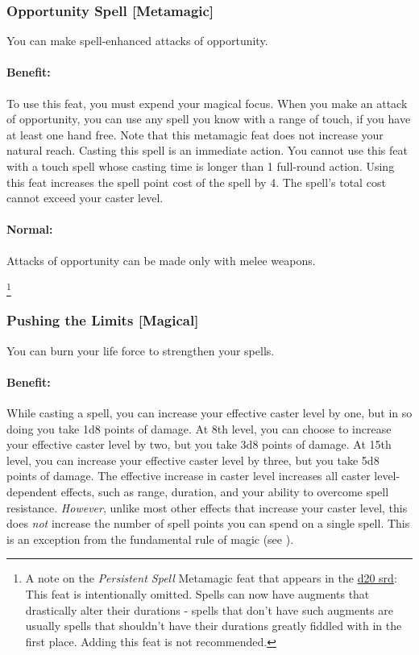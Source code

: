 \subsubsection[Opportunity Spell]{Opportunity Spell [Metamagic]}
\label{Feat:OpportunitySpell}
You can make spell-enhanced attacks of opportunity.

\paragraph{Benefit:} To use this feat, you must expend your magical focus. 
When you make an attack of opportunity, you can use any spell you know with a range of touch, if you have at least one hand free.
Note that this metamagic feat does not increase your natural reach.
Casting this spell is an immediate action.
You cannot use this feat with a touch spell whose casting time is longer than 1 full-round action.
Using this feat increases the spell point cost of the spell by 4. The spell's total cost cannot exceed your caster level.

\paragraph{Normal:} Attacks of opportunity can be made only with melee weapons.

\footnote{A note on the \emph{Persistent Spell} Metamagic feat that appears in the \href{http://www.wizards.com/default.asp?x=d20/article/srd35}{d20 srd}:
This feat is intentionally omitted. Spells can now have augments that drastically alter their durations - spells that don't have such augments
are usually spells that shouldn't have their durations greatly fiddled with in the first place. Adding this feat is not recommended.}
\subsubsection[Pushing the Limits]{Pushing the Limits [Magical]}
\label{Feat:PushingTheLimits}
You can burn your life force to strengthen your spells.

\paragraph{Benefit:} While casting a spell, you can increase your effective caster level by one, but in so doing you take 1d8 points of damage. 
At 8th level, you can choose to increase your effective caster level by two, but you take 3d8 points of damage. 
At 15th level, you can increase your effective caster level by three, but you take 5d8 points of damage.
The effective increase in caster level increases all caster level-dependent effects, such as range, duration, and 
your ability to overcome spell resistance. \emph{However}, unlike most other effects that increase your caster level, this does \emph{not}
increase the number of spell points you can spend on a single spell. 
This is an exception from the fundamental rule of magic (see ).

